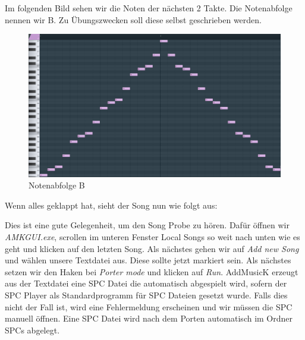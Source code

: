 

\medskip

Im folgenden Bild sehen wir die Noten der nächsten 2 Takte. Die Notenabfolge nennen wir B. Zu Übungszwecken soll diese selbst geschrieben werden.


\begin{figure}[htbp] \centering
	\includegraphics[width=.95\linewidth]{images/Noten_B.png}
	\caption{Notenabfolge B}
	\label{NotenabfolgeB}
\end{figure}

Wenn alles geklappt hat, sieht der Song nun wie folgt aus:

\medskip



\medskip

Dies ist eine gute Gelegenheit, um den Song Probe zu hören.
Dafür öffnen wir \textit{AMKGUI.exe}, scrollen im unteren Fenster Local Songs so weit nach unten wie es geht und klicken auf den letzten Song. Als nächstes gehen wir auf \textit{Add new Song} und wählen unsere Textdatei aus. Diese sollte jetzt markiert sein. Als nächstes setzen wir den Haken bei \textit{Porter mode} und klicken auf \textit{Run}. AddMusicK erzeugt aus der Textdatei eine SPC Datei die automatisch abgespielt wird, sofern der SPC Player als Standardprogramm für SPC Dateien gesetzt wurde. Falls dies nicht der Fall ist, wird eine Fehlermeldung erscheinen und wir müssen die SPC manuell öffnen. Eine SPC Datei wird nach dem Porten automatisch im Ordner SPCs abgelegt.


